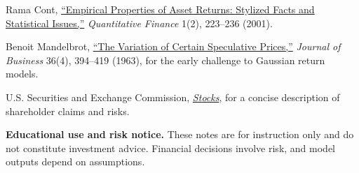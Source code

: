 \documentclass[11pt]{article}
\begin{document}
\begin{readinglist}
  \item Rama Cont, \href{https://doi.org/10.1080/713665670}{``Empirical Properties of Asset Returns: Stylized Facts and Statistical Issues,''} \emph{Quantitative Finance} 1(2), 223--236 (2001).
  \item Benoit Mandelbrot, \href{https://www.jstor.org/stable/2350970}{``The Variation of Certain Speculative Prices,''} \emph{Journal of Business} 36(4), 394--419 (1963), for the early challenge to Gaussian return models.
  \item U.S. Securities and Exchange Commission, \href{https://www.investor.gov/introduction-investing/investing-basics/investment-products/stocks}{\emph{Stocks}}, for a concise description of shareholder claims and risks.
\end{readinglist}

\vfill
{\sffamily\footnotesize\color{vnmuted}\textbf{Educational use and risk notice.} These notes are for instruction only and do not constitute investment advice. Financial decisions involve risk, and model outputs depend on assumptions.}
\end{document}
